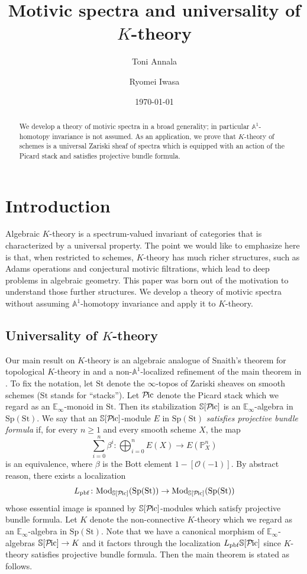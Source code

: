 \documentclass{amsart}
\title{Motivic spectra and universality of $K$-theory}
\author{Toni Annala}
\author{Ryomei Iwasa}
\theoremstyle{plain}
\theoremstyle{definition}
\theoremstyle{remark}
\numberwithin{equation}{theorem}
\newcommand{\mcal}[1]{\mathcal{#1}}
\newcommand{\mbb}[1]{\mathbb{#1}}
\newcommand{\Mod}{\mathrm{Mod}}
\newcommand{\Sp}{\mathrm{Sp}}
\newcommand{\St}{\mathrm{St}}
\newcommand{\pbf}{\mathrm{pbf}}
\newcommand{\Pic}{{\mathcal{P}\mspace{-2.0mu}\mathrm{ic}}}
\begin{document}
\date{\today}

\begin{abstract}
We develop a theory of motivic spectra in a broad generality; in particular $\mbb{A}^1$-homotopy invariance is not assumed.
As an application, we prove that $K$-theory of schemes is a universal Zariski sheaf of spectra which is equipped with an action of the Picard stack and satisfies projective bundle formula.
\end{abstract}

\maketitle

\tableofcontents




\section{Introduction}\label{Int}

Algebraic $K$-theory is a spectrum-valued invariant of categories that is characterized by a universal property.
The point we would like to emphasize here is that, when restricted to schemes, $K$-theory has much richer structures, such as Adams operations and conjectural motivic filtrations, which lead to deep problems in algebraic geometry.
This paper was born out of the motivation to understand those further structures.
We develop a theory of motivic spectra without assuming $\mbb{A}^1$-homotopy invariance and apply it to $K$-theory.

\subsection{Universality of $K$-theory}

Our main result on $K$-theory is an algebraic analogue of Snaith's theorem for topological $K$-theory in \cite{Sn79,Sn83} and a non-$\mbb{A}^1$-localized refinement of the main theorem in \cite{GS,SO}.
To fix the notation, let $\St$ denote the $\infty$-topos of Zariski sheaves on smooth schemes ($\St$ stands for ``stacks'').
Let $\Pic$ denote the Picard stack which we regard as an $\mbb{E}_\infty$-monoid in $\St$.
Then its stabilization $\mbb{S}[\Pic]$ is an $\mbb{E}_\infty$-algebra in $\Sp(\St)$.
We say that an $\mbb{S}[\Pic]$-module $E$ in $\Sp(\St)$ \textit{satisfies projective bundle formula} if, for every $n\ge 1$ and every smooth scheme $X$, the map
\[
	\sum_{i=0}^n \beta^i \colon \bigoplus_{i=0}^n E(X) \to E(\mbb{P}^n_X)
\]
is an equivalence, where $\beta$ is the Bott element $1-[\mcal{O}(-1)]$.
By abstract reason, there exists a localization
\[
	L_\pbf\colon\Mod_{\mbb{S}[\Pic]}(\Sp(\St))\to\Mod_{\mbb{S}[\Pic]}(\Sp(\St))
\]
whose essential image is spanned by $\mbb{S}[\Pic]$-modules which satisfy projective bundle formula.
Let $K$ denote the non-connective $K$-theory which we regard as an $\mbb{E}_\infty$-algebra in $\Sp(\St)$.
Note that we have a canonical morphism of $\mbb{E}_\infty$-algebras $\mbb{S}[\Pic]\to K$ and it factors through the localization $L_\pbf\mbb{S}[\Pic]$ since $K$-theory satisfies projective bundle formula.
Then the main theorem is stated as follows.
\end{document}
